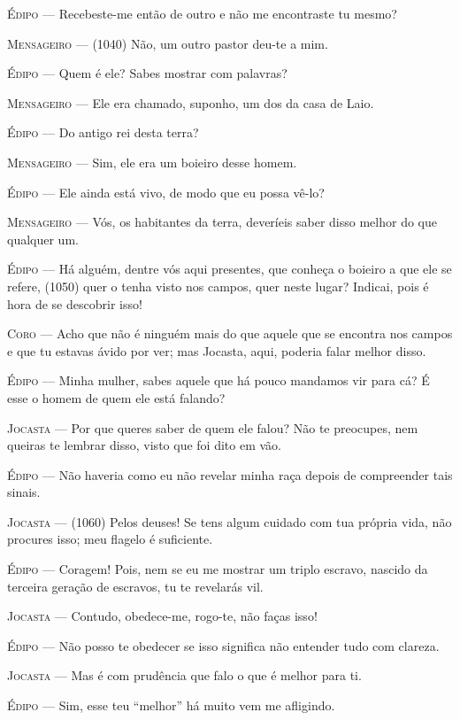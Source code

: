 \textsc{Édipo} --- Recebeste-me então de outro e não me encontraste tu mesmo?

\textsc{Mensageiro} --- (1040) Não, um outro pastor deu-te a mim.

\textsc{Édipo} --- Quem é ele? Sabes mostrar com palavras?

\textsc{Mensageiro} --- Ele era chamado, suponho, um dos da casa de Laio.

\textsc{Édipo} --- Do antigo rei desta terra?

\textsc{Mensageiro} --- Sim, ele era um boieiro desse homem.

\textsc{Édipo} --- Ele ainda está vivo, de modo que eu possa vê-lo?

\textsc{Mensageiro} --- Vós, os habitantes da terra, deveríeis saber disso melhor do que
qualquer um.

\textsc{Édipo} --- Há alguém, dentre vós aqui presentes, que conheça o boieiro a que ele se
refere, (1050) quer o tenha visto nos campos, quer neste lugar? Indicai,
pois é hora de se descobrir isso!

\textsc{Coro} --- Acho que não é ninguém mais do que aquele que se encontra nos campos e
que tu estavas ávido por ver; mas Jocasta, aqui, poderia falar melhor
disso.

\textsc{Édipo} --- Minha mulher, sabes aquele que há pouco mandamos vir para cá? É esse o
homem de quem ele está falando?

\textsc{Jocasta} --- Por que queres saber de quem ele falou? Não te preocupes, nem queiras te
lembrar disso, visto que foi dito em vão.

\textsc{Édipo} --- Não haveria como eu não revelar minha raça depois de compreender tais
sinais.

\textsc{Jocasta} --- (1060) Pelos deuses! Se tens algum cuidado com tua própria vida, não
procures isso; meu flagelo é suficiente.

\textsc{Édipo} --- Coragem! Pois, nem se eu me mostrar um triplo escravo, nascido da
terceira geração de escravos, tu te revelarás vil.

\textsc{Jocasta} --- Contudo, obedece-me, rogo-te, não faças isso!

\textsc{Édipo} --- Não posso te obedecer se isso significa não entender tudo com clareza.

\textsc{Jocasta} --- Mas é com prudência que falo o que é melhor para ti.

\textsc{Édipo} --- Sim, esse teu ``melhor'' há muito vem me afligindo.


